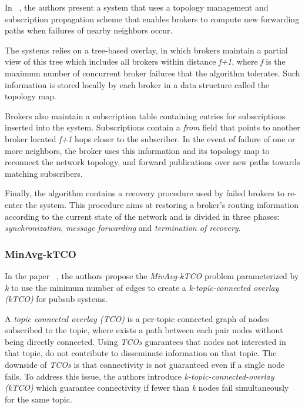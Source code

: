 In ~\cite{reliable-highly-available-pub-sub}, the authors present a system that uses a topology management and subscription propagation scheme that enables brokers to compute new forwarding paths when failures of nearby neighbors occur.

The systems relies on a tree-based overlay, in which brokers maintain a partial view of this tree which includes all brokers within distance \textit{f+1}, where \textit{f} is the maximum number of concurrent broker failures that the algorithm tolerates. Such information is stored locally by each broker in a data structure called the  topology map.

Brokers also maintain a subscription table containing entries for subscriptions inserted into the system. Subscriptions contain a \textit{from} field that points to another broker located \textit{f+1} hops closer to the subscriber. In the event of failure of one or more neighbors, the broker uses this information and its topology map to reconnect the network topology, and forward publications over new paths towards matching subscribers.

Finally, the algorithm contains a recovery procedure used by failed brokers to re-enter the system. This procedure aims at restoring a broker's routing information according to the current state of the network and is divided in three phases: \textit{synchronization}, \textit{message forwarding} and \textit{termination of recovery}.  

\subsubsection{MinAvg-kTCO}
\label{sec:minavg_tco}

In the paper ~\cite{minavg-k-tco}, the authors propose the \textit{MivAvg-kTCO} problem parameterized by \textit{k} to use the minimum number of edges to create a \textit{k-topic-connected overlay ({kTCO})} for \gls{pubsub} systems.

A \textit{topic connected overlay (TCO)} is a per-topic connected graph of nodes subscribed to the topic, where exists a path between each pair nodes without being directly connected. Using \textit{TCOs} guarantees that nodes not interested in that topic, do not contribute to disseminate information on that topic. The downside of \textit{TCOs} is that connectivity is not guaranteed even if a single node fails. To address this issue, the authors introduce \textit{k-topic-connected-overlay (kTCO)} which guarantee connectivity if fewer than \textit{k} nodes fail simultaneously for the same topic.

